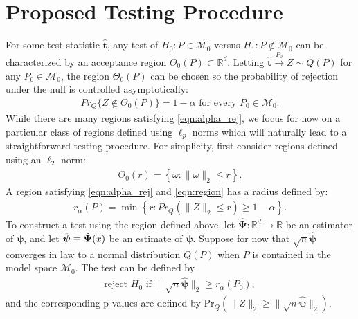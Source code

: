 \documentclass{article}
\newcommand{\disto}{P}
\newcommand{\tst}{\hat{\boldsymbol{t}}}
\newcommand{\rvv}{Z}
\newcommand{\distv}{Q}
\begin{document}
\section{Proposed Testing Procedure}
\label{sec:prop_test_proc}
For some test statistic $\tst$, any test of $H_0 : \disto \in \mathscr{M}_0$ versus $H_1 : \disto \not\in \mathscr{M}_0$ can be characterized by an acceptance region $\Theta_0(\disto) \subset \mathbb{R}^d$.  Letting $ \tst \xrightarrow{P_0} \rvv \sim \distv(\disto)$ for any $P_0 \in \mathscr{M}_0$, the region $\Theta_0(\disto)$ can be chosen so the probability of rejection under the null is controlled asymptotically:
\begin{align}
  Pr_{\distv}\{\rvv \not \in \Theta_0(P)\} = 1 - \alpha \text{ for every } P_0 \in \mathscr{M}_0.\label{eqn:alpha_rej}
\end{align}
While there are many regions satisfying \eqref{eqn:alpha_rej},  we focus for now on a particular class of regions defined using $\ell_p$ norms which will naturally lead to a straightforward testing procedure. For simplicity, first consider regions defined using an $\ell_2$ norm:
\begin{align}
	\Theta_0(r) = \left\{\omega : \|\omega\|_2 \leq r\right\}. \label{eqn:region}
\end{align}
A region satisfying \eqref{eqn:alpha_rej} and \eqref{eqn:region} has a radius defined by: 
\begin{align}
	r_\alpha(\disto) = \min\left\{r : Pr_{\distv}(\|\rvv\|_2 \leq r) \geq 1 - \alpha \right\}. \label{eqn:ra}
\end{align}
To construct a test using the region defined above, let $\hat{\boldsymbol{\Psi}} : \mathbb{R}^d \to \mathbb{R}$ be an estimator of $\boldsymbol{\psi}$, and let $\Hat{\boldsymbol{\psi}} \equiv \hat{\boldsymbol{\Psi}}(x)$ be an estimate of $\boldsymbol{\psi}$. Suppose for now that $\sqrt{n}\hat{\boldsymbol{\psi}}$ converges in law to a normal distribution $\distv(P)$ when $P$ is contained in the model space  $\mathcal{M}_0$. The test can be defined by 
\begin{align}
\label{eqn:simp_test}
	\text{reject } H_0 \text{ if } \|\sqrt{n} \hat{\boldsymbol{\psi}}\|_2 \geq r_\alpha(P_0),
\end{align} 
and the corresponding p-values are defined by $
	\text{Pr}_\distv(\|\rvv\|_2 \geq \|\sqrt{n} \hat{\boldsymbol{\psi}}\|_2)$.

\end{document}
